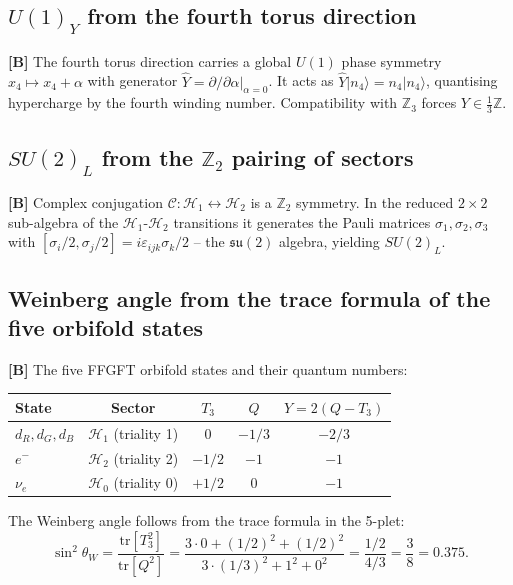 \subsection{$U(1)_Y$ from the fourth torus direction}

\textbf{[B]} The fourth torus direction carries a global $U(1)$ phase
symmetry $x_4 \mapsto x_4+\alpha$ with generator
$\hat{Y} = \partial/\partial\alpha|_{\alpha=0}$.
It acts as $\hat{Y}|n_4\rangle = n_4|n_4\rangle$, quantising
hypercharge by the fourth winding number.
Compatibility with $\mathbb{Z}_3$ forces $Y\in\tfrac{1}{3}\mathbb{Z}$.

\subsection{$SU(2)_L$ from the $\mathbb{Z}_2$ pairing of sectors}

\textbf{[B]} Complex conjugation $\mathcal{C}:\mathcal{H}_1
\leftrightarrow\mathcal{H}_2$ is a $\mathbb{Z}_2$ symmetry. In the
reduced $2\times2$ sub-algebra of the $\mathcal{H}_1$-$\mathcal{H}_2$
transitions it generates the Pauli matrices
$\sigma_1,\sigma_2,\sigma_3$ with
$[\sigma_i/2,\sigma_j/2]=i\varepsilon_{ijk}\sigma_k/2$
-- the $\mathfrak{su}(2)$ algebra, yielding $SU(2)_L$.

\subsection{Weinberg angle from the trace formula of the five orbifold states}

\textbf{[B]} The five FFGFT orbifold states and their quantum numbers:

\begin{center}
\begin{tabular}{lcccc}
\toprule
State & Sector & $T_3$ & $Q$ & $Y=2(Q-T_3)$ \\
\midrule
$d_R,d_G,d_B$ & $\mathcal{H}_1$ (triality 1) & $0$ & $-1/3$ & $-2/3$ \\
$e^-$         & $\mathcal{H}_2$ (triality 2) & $-1/2$ & $-1$ & $-1$ \\
$\nu_e$       & $\mathcal{H}_0$ (triality 0) & $+1/2$ & $0$  & $-1$ \\
\bottomrule
\end{tabular}
\end{center}

The Weinberg angle follows from the trace formula in the 5-plet:
\begin{equation}
  \sin^2\theta_W = \frac{\mathrm{tr}[T_3^2]}{\mathrm{tr}[Q^2]}
  = \frac{3\cdot0 + (1/2)^2 + (1/2)^2}
         {3\cdot(1/3)^2 + 1^2 + 0^2}
  = \frac{1/2}{4/3}
  = \boxed{\frac{3}{8} = 0.375.}
  \label{eq:sin2}
\end{equation}

